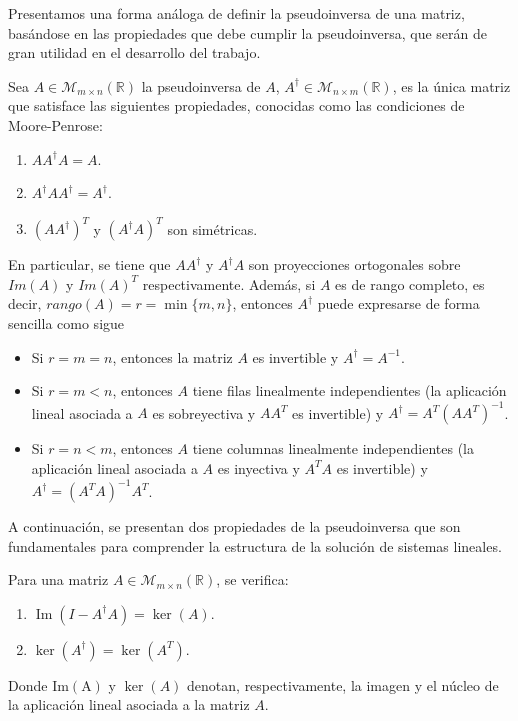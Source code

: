 Presentamos una forma análoga de definir la pseudoinversa de una matriz, basándose en las propiedades que debe cumplir la pseudoinversa, que serán de gran utilidad en el desarrollo del trabajo.
\begin{definicion}
    Sea $A \in \mathcal{M}_{m \times n}(\mathbb{R})$ la pseudoinversa de $A$, $A^{\dagger} \in \mathcal{M}_{n \times m}(\mathbb{R})$, es la única matriz que satisface las siguientes propiedades, conocidas como las condiciones de Moore-Penrose:

    \begin{enumerate}
        \item $A A^{\dagger} A = A$.
        \item $A^{\dagger} A A^{\dagger} = A^{\dagger}$.
        \item ${(A A^{\dagger})}^{T}$ y ${(A^{\dagger} A)}^{T}$ son simétricas.
    \end{enumerate}

    En particular, se tiene que $AA^{\dagger}$ y $A^{\dagger}A$ son proyecciones ortogonales sobre $Im(A)$ y ${Im(A)}^{T}$ respectivamente. Además, si $A$ es de rango completo, es decir, $rango(A) = r  = \min\{m, n\}$, entonces $A^{\dagger}$ puede expresarse de forma sencilla como sigue

    \begin{itemize}
        \item Si $r = m = n$, entonces la matriz $A$ es invertible y $A^{\dagger} = A^{-1}$.
        \item Si $r = m < n$, entonces $A$ tiene filas linealmente independientes (la aplicación lineal asociada a $A$ es sobreyectiva y $AA^{T}$ es invertible) y $A^{\dagger} = A^{T}{(AA^{T})}^{-1}$.
        \item Si $r = n < m$, entonces $A$ tiene columnas linealmente independientes (la aplicación lineal asociada a $A$ es inyectiva y $A^{T}A$ es invertible) y $A^{\dagger} = {(A^{T}A)}^{-1} A^{T}$.\newline
    \end{itemize}
\end{definicion}

A continuación, se presentan dos propiedades de la pseudoinversa que son fundamentales para comprender la estructura de la solución de sistemas lineales.

\begin{lema}\label{lema:propiedades-pseudoinversa}
    Para una matriz $A \in \mathcal{M}_{m \times n}(\mathbb{R})$, se verifica:

    \begin{enumerate}
        \item $\operatorname{Im}(I-A^{\dagger}A) = \ker(A)$.
        \item $\ker(A^{\dagger}) = \ker(A^{T})$.
    \end{enumerate}

    Donde $\operatorname{Im(A)}$ y $\ker(A)$ denotan, respectivamente, la imagen y el núcleo de la aplicación lineal asociada a la matriz $A$.\newline
\end{lema}

